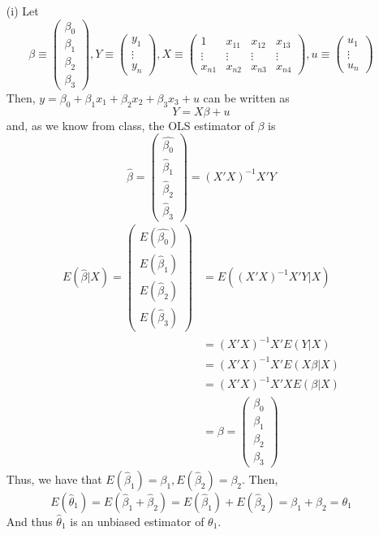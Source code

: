 \documentclass[
]{article}
\begin{document}
\begin{enumerate}
\item[(i)]
Let 
\[\beta \equiv
\begin{pmatrix}
\beta_0 \\
\beta_1 \\
\beta_2 \\
\beta_3
\end{pmatrix},
Y \equiv \begin{pmatrix}
y_1 \\ \vdots \\ y_n 
\end{pmatrix}, X \equiv \begin{pmatrix}
1 & x_{11} & x_{12} & x_{13} \\\vdots &\vdots&\vdots&\vdots \\ x_{n1} & x_{n2} & x_{n3} & x_{n4}
\end{pmatrix}, 
u \equiv \begin{pmatrix}
u_1 \\ \vdots \\ u_n 
\end{pmatrix}\]
Then, $y = \beta_0 + \beta_1 x_1 + \beta_2 x_2 + \beta_3 x_3 + u$ can be written as 
\[Y = X\beta + u\] 
and, as we know from class, the OLS estimator of $\beta$ is 
\[\hat{\beta} = \begin{pmatrix} \hat{\beta_0} \\ \hat\beta_1 \\ \hat\beta_2 \\ \hat\beta_3 \end{pmatrix} = (X'X)^{-1} X' Y\]
\[\begin{aligned} E(\hat\beta|X) = \begin{pmatrix} E(\hat{\beta_0}) \\ E(\hat\beta_1) \\ E(\hat\beta_2) \\ E(\hat\beta_3) \end{pmatrix} &= E((X'X)^{-1}X' Y|X)\\
&=(X'X)^{-1}X'E(Y|X) \\
&= (X'X)^{-1}X'E(X\beta|X) \\
&= (X'X)^{-1}X'XE(\beta|X) \\
&= \beta = \begin{pmatrix}
\beta_0 \\
\beta_1 \\
\beta_2 \\
\beta_3
\end{pmatrix}
\end{aligned}\]
Thus, we have that $E(\hat\beta_1) = \beta_1, E(\hat\beta_2) = \beta_2$. Then, 
\[E(\hat\theta_1) = E(\hat\beta_1 + \hat\beta_2) = E(\hat\beta_1) + E(\hat\beta_2) = \beta_1 + \beta_2 = \theta_1\]
And thus $\hat\theta_1$ is an unbiased estimator of $\theta_1$. 


\end{enumerate}
\end{document}
